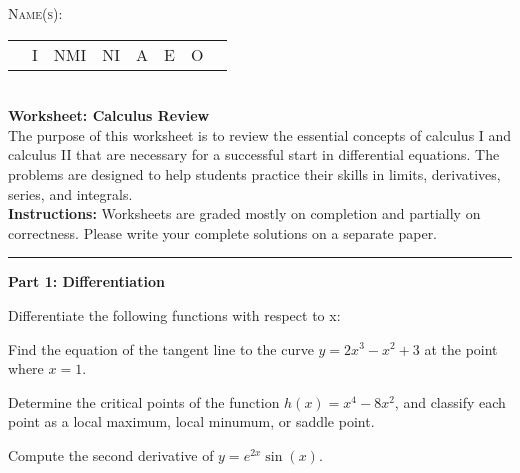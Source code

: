 \documentclass[12pt,letterpaper,answers]{exam}
\begin{document}

\textsc{Name(s):} \\

\begin{tabular}{l @{\hskip 8mm} l @{\hskip 8mm} l @{\hskip 8mm} l @{\hskip 8mm} l @{\hskip 8mm} l @{\hskip 8mm} l @{\hskip 8mm} l}
 {\bf } & I & NMI & NI & A & E & O \\
\end{tabular} \\

\textbf{Worksheet: Calculus Review} \\

The purpose of this worksheet is to review the essential concepts of calculus I and calculus II that are necessary for a successful start in differential equations. The problems are designed to help students practice their skills in limits, derivatives, series, and integrals. \\

\textbf{Instructions:} Worksheets are graded mostly on completion and partially on correctness. Please write your complete solutions on a separate paper.

\vspace{5mm} 
\hrule
 \vspace{5mm}
 
  \vspace{10mm}

\textbf{Part 1: Differentiation} \\

\begin{questions}
\question Differentiate the following functions with respect to x:


\question Find the equation of the tangent line to the curve $y = 2x^3 - x^2 + 3$ at the point where $x = 1$.

\question Determine the critical points of the function $h(x) = x^4 - 8x^2$, and classify each point as a local maximum, local minumum, or saddle point.

\question Compute the second derivative of $y = e^{2x} \sin{(x)}$.
\end{questions}
\end{document}
